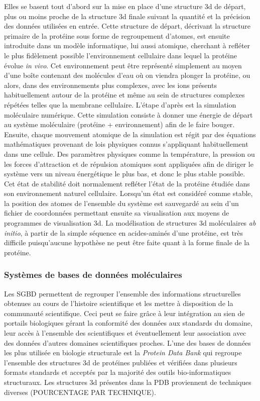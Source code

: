 Elles se basent tout d'abord sur la mise en place d'une structure 3d de départ, plus ou moins proche de la structure 3d finale suivant la quantité et la précision des données utilisées en entrée. Cette structure de départ, décrivant la structure primaire de la protéine sous forme de regroupement d'atomes, est ensuite introduite dans un modèle informatique, lui aussi atomique, cherchant à refléter le plus fidèlement possible l'environnement cellulaire dans lequel la protéine évolue \textit{in vivo}. Cet environnement peut être représenté simplement au moyen d'une boîte contenant des molécules d'eau où on viendra plonger la protéine, ou alors, dans des environnements plus complexes, avec les ions présents habituellement autour de la protéine et même au sein de structures complexes répétées telles que la membrane cellulaire. L'étape d'après est la simulation moléculaire numérique. Cette simulation consiste à donner une énergie de départ au système moléculaire (protéine + environnement) afin de le faire bouger. Ensuite, chaque mouvement atomique de la simulation est régit par des équations mathématiques provenant de lois physiques connus s'appliquant habituellement dans une cellule. Des paramètres physiques comme la température, la pression ou les forces d'attraction et de répulsion atomiques sont appliquées afin de diriger le système vers un niveau énergétique le plus bas, et donc le plus stable possible. Cet état de stabilité doit normalement refléter l'état de la protéine étudiée dans son environnement naturel cellulaire. Lorsqu'un état est considéré comme stable, la position des atomes de l'ensemble du système est sauvegardé au sein d'un fichier de coordonnées permettant ensuite sa visualisation aux moyens de programmes de visualisation 3d.
La modélisation de structures 3d moléculaires \textit{ab initio}, à partir de la simple séquence en acides-aminés d'une protéine, est très difficile puisqu'aucune hypothèse ne peut être faite quant à la forme finale de la protéine.

\subsubsection{Systèmes de bases de données moléculaires}

Les SGBD permettent de regrouper l'ensemble des informations structurelles obtenues au cours de l'histoire scientifique et les mettre à disposition de la communauté scientifique. Ceci peut se faire grâce à leur intégration au sien de portails biologiques gérant la conformité des données aux standards du domaine, leur accès à l'ensemble des scientifiques et éventuellement leur association avec des données d'autres domaines scientifiques proches. L'une des bases de données les plus utilisée en biologie structurale est la \textit{Protein Data Bank} qui regroupe l'ensemble des structures 3d de protéines publiées et vérifiées dans plusieurs formats standards et acceptés par la majorité des outils bio-informatiques structuraux. Les structures 3d présentes dans la PDB proviennent de techniques diverses (POURCENTAGE PAR TECHNIQUE).




